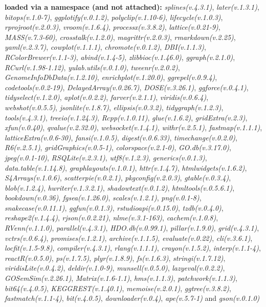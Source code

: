 \documentclass[
]{book}
\begin{document}
\textbf{loaded via a namespace (and not attached):}
\emph{splines(v.4.3.1)}, \emph{later(v.1.3.1)}, \emph{bitops(v.1.0-7)}, \emph{ggplotify(v.0.1.2)}, \emph{polyclip(v.1.10-6)}, \emph{lifecycle(v.1.0.3)}, \emph{rprojroot(v.2.0.3)}, \emph{vroom(v.1.6.4)}, \emph{processx(v.3.8.2)}, \emph{lattice(v.0.21-9)}, \emph{MASS(v.7.3-60)}, \emph{crosstalk(v.1.2.0)}, \emph{magrittr(v.2.0.3)}, \emph{rmarkdown(v.2.25)}, \emph{yaml(v.2.3.7)}, \emph{cowplot(v.1.1.1)}, \emph{chromote(v.0.1.2)}, \emph{DBI(v.1.1.3)}, \emph{RColorBrewer(v.1.1-3)}, \emph{abind(v.1.4-5)}, \emph{zlibbioc(v.1.46.0)}, \emph{ggraph(v.2.1.0)}, \emph{RCurl(v.1.98-1.12)}, \emph{yulab.utils(v.0.1.0)}, \emph{tweenr(v.2.0.2)}, \emph{GenomeInfoDbData(v.1.2.10)}, \emph{enrichplot(v.1.20.0)}, \emph{ggrepel(v.0.9.4)}, \emph{codetools(v.0.2-19)}, \emph{DelayedArray(v.0.26.7)}, \emph{DOSE(v.3.26.1)}, \emph{ggforce(v.0.4.1)}, \emph{tidyselect(v.1.2.0)}, \emph{aplot(v.0.2.2)}, \emph{farver(v.2.1.1)}, \emph{viridis(v.0.6.4)}, \emph{webshot(v.0.5.5)}, \emph{jsonlite(v.1.8.7)}, \emph{ellipsis(v.0.3.2)}, \emph{tidygraph(v.1.2.3)}, \emph{tools(v.4.3.1)}, \emph{treeio(v.1.24.3)}, \emph{Rcpp(v.1.0.11)}, \emph{glue(v.1.6.2)}, \emph{gridExtra(v.2.3)}, \emph{xfun(v.0.40)}, \emph{qvalue(v.2.32.0)}, \emph{websocket(v.1.4.1)}, \emph{withr(v.2.5.1)}, \emph{fastmap(v.1.1.1)}, \emph{latticeExtra(v.0.6-30)}, \emph{fansi(v.1.0.5)}, \emph{digest(v.0.6.33)}, \emph{timechange(v.0.2.0)}, \emph{R6(v.2.5.1)}, \emph{gridGraphics(v.0.5-1)}, \emph{colorspace(v.2.1-0)}, \emph{GO.db(v.3.17.0)}, \emph{jpeg(v.0.1-10)}, \emph{RSQLite(v.2.3.1)}, \emph{utf8(v.1.2.3)}, \emph{generics(v.0.1.3)}, \emph{data.table(v.1.14.8)}, \emph{graphlayouts(v.1.0.1)}, \emph{httr(v.1.4.7)}, \emph{htmlwidgets(v.1.6.2)}, \emph{S4Arrays(v.1.0.6)}, \emph{scatterpie(v.0.2.1)}, \emph{pkgconfig(v.2.0.3)}, \emph{gtable(v.0.3.4)}, \emph{blob(v.1.2.4)}, \emph{hwriter(v.1.3.2.1)}, \emph{shadowtext(v.0.1.2)}, \emph{htmltools(v.0.5.6.1)}, \emph{bookdown(v.0.36)}, \emph{fgsea(v.1.26.0)}, \emph{scales(v.1.2.1)}, \emph{png(v.0.1-8)}, \emph{snakecase(v.0.11.1)}, \emph{ggfun(v.0.1.3)}, \emph{rstudioapi(v.0.15.0)}, \emph{tzdb(v.0.4.0)}, \emph{reshape2(v.1.4.4)}, \emph{rjson(v.0.2.21)}, \emph{nlme(v.3.1-163)}, \emph{cachem(v.1.0.8)}, \emph{RVenn(v.1.1.0)}, \emph{parallel(v.4.3.1)}, \emph{HDO.db(v.0.99.1)}, \emph{pillar(v.1.9.0)}, \emph{grid(v.4.3.1)}, \emph{vctrs(v.0.6.4)}, \emph{promises(v.1.2.1)}, \emph{archive(v.1.1.5)}, \emph{evaluate(v.0.22)}, \emph{cli(v.3.6.1)}, \emph{locfit(v.1.5-9.8)}, \emph{compiler(v.4.3.1)}, \emph{rlang(v.1.1.1)}, \emph{crayon(v.1.5.2)}, \emph{interp(v.1.1-4)}, \emph{reactR(v.0.5.0)}, \emph{ps(v.1.7.5)}, \emph{plyr(v.1.8.9)}, \emph{fs(v.1.6.3)}, \emph{stringi(v.1.7.12)}, \emph{viridisLite(v.0.4.2)}, \emph{deldir(v.1.0-9)}, \emph{munsell(v.0.5.0)}, \emph{lazyeval(v.0.2.2)}, \emph{GOSemSim(v.2.26.1)}, \emph{Matrix(v.1.6-1.1)}, \emph{hms(v.1.1.3)}, \emph{patchwork(v.1.1.3)}, \emph{bit64(v.4.0.5)}, \emph{KEGGREST(v.1.40.1)}, \emph{memoise(v.2.0.1)}, \emph{ggtree(v.3.8.2)}, \emph{fastmatch(v.1.1-4)}, \emph{bit(v.4.0.5)}, \emph{downloader(v.0.4)}, \emph{ape(v.5.7-1)} and \emph{gson(v.0.1.0)}

  
\end{document}
